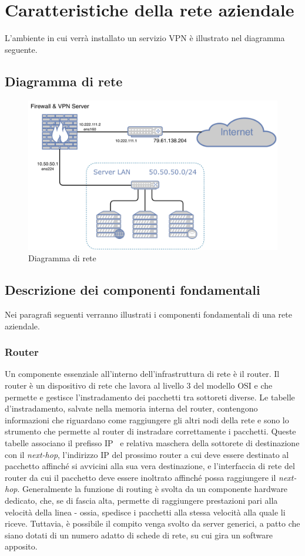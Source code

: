 \section{Caratteristiche della rete aziendale}
L'ambiente in cui verrà installato un servizio VPN è illustrato nel diagramma seguente.
\subsection{Diagramma di rete}
\begin{figure}[h]
    \centering
    \includegraphics[width=14cm]{figure/networkDiagram.pdf}
    \caption{Diagramma di rete}
\end{figure}


\subsection{Descrizione dei componenti fondamentali}
Nei paragrafi seguenti verranno illustrati i componenti fondamentali di una rete aziendale.
\subsubsection{Router}
Un componente essenziale all'interno dell'infrastruttura di rete è il router. Il router è un dispositivo di rete che lavora al livello $3$ del modello OSI e che permette e gestisce l'instradamento dei pacchetti tra sottoreti diverse.
Le tabelle d'instradamento, salvate nella memoria interna del router, contengono informazioni che riguardano come raggiungere gli altri nodi della rete e sono lo strumento che permette al router di instradare correttamente i pacchetti.
Queste tabelle associano il prefisso IP~\cite[RFC0791]{RFC0791} e relativa maschera della sottorete di destinazione con il \emph{next-hop}, l'indirizzo IP del prossimo router a cui deve essere destinato al pacchetto affinché si avvicini alla sua vera destinazione, e l'interfaccia di rete del router da cui il pacchetto deve essere inoltrato affinché possa raggiungere il \emph{next-hop}.
Generalmente la funzione di routing è svolta da un componente hardware dedicato, che, se di fascia alta, permette di raggiungere prestazioni pari alla velocità della linea - ossia, spedisce i pacchetti alla stessa velocità alla quale li riceve.
Tuttavia, è possibile il compito venga svolto da server generici, a patto che siano dotati di un numero adatto di schede di rete, su cui gira un software apposito.

